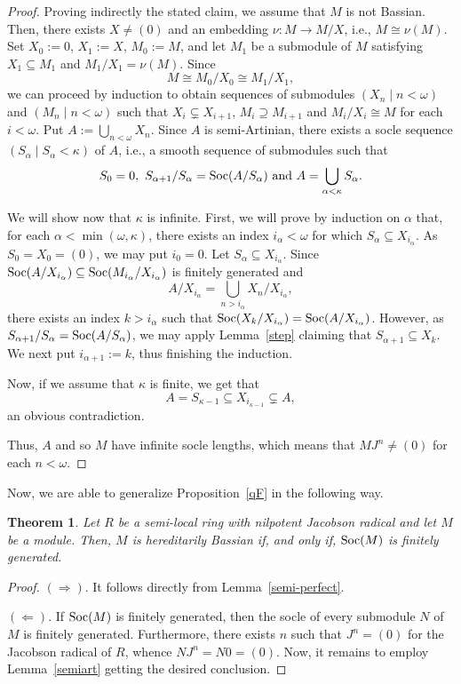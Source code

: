 \documentclass{amsart}
\newtheorem{thm}{Theorem}[section]
\theoremstyle{definition}
\DeclareMathOperator{\Soc}{\rm Soc}
\begin{document}
\begin{proof} Proving indirectly the stated claim, we assume that $M$ is not Bassian. Then, there exists $X\ne (0)$ and an embedding $\nu: M\to M/X$, i.e., $M\cong\nu(M)$. Set $X_0:=0$, $X_1:=X$, $M_0:=M$, and let $M_1$ be a submodule of $M$ satisfying $X_1\subseteq M_1$ and $M_1/X_1=\nu(M)$. Since $$M\cong M_0/X_0\cong M_1/X_1,$$ we can proceed by induction to obtain sequences of submodules $(X_n\mid n<\omega)$ and $(M_n\mid n<\omega)$ such that $X_{i}\subsetneq X_{i+1}$, $M_i \supseteq M_{i+1}$ and $M_i/X_i\cong M$ for each $i<\omega$. Put $A:=\bigcup_{n<\omega} X_n$. Since $A$ is semi-Artinian, there exists a socle sequence $(S_\alpha\mid S_\alpha<\kappa)$ of $A$, i.e., a smooth sequence of submodules such that $$S_0=0, ~ S_{\alpha+1}/S_\alpha=\Soc(A/S_\alpha) ~ {\rm and} ~ A=\bigcup_{\alpha<\kappa} S_\alpha.$$

We will show now that $\kappa$ is infinite. First, we will prove by induction on $\alpha$ that, for each $\alpha<\min(\omega,\kappa)$, there exists an index $i_\alpha<\omega$ for which $S_\alpha\subseteq X_{i_\alpha}$. As $S_0=X_0=(0)$, we may put $i_0=0$. Let $S_\alpha\subseteq X_{i_\alpha}$. Since $\Soc(A/X_{i_\alpha})\subseteq \Soc(M_{i_\alpha}/X_{i_\alpha})$ is finitely generated and $$A/X_{i_\alpha}=\bigcup_{n>i_\alpha} X_n/X_{i_\alpha},$$ there exists an index $k>i_\alpha$ such that $\Soc(X_k/X_{i_\alpha})=\Soc(A/X_{i_\alpha})$. However, as $S_{\alpha+1}/S_\alpha=\Soc(A/S_\alpha)$, we may apply Lemma~\ref{step} claiming that $S_{\alpha+1}\subseteq X_k$. We next put $i_{\alpha+1}:=k$, thus finishing the induction.

Now, if we assume that $\kappa$ is finite, we get that
$$
A=S_{\kappa-1}\subseteq X_{i_{\kappa-1}}\subsetneq A,
$$
an obvious contradiction.

Thus, $A$ and so $M$ have infinite socle lengths, which means that $MJ^n\ne (0)$ for each $n<\omega$.
\end{proof}

Now, we are able to generalize Proposition~\ref{qF} in the following way.

\begin{thm}\label{artinian} Let $R$ be a semi-local ring with nilpotent Jacobson radical and let $M$ be a module. Then, $M$ is hereditarily Bassian if, and only if, $\Soc(M)$ is finitely generated.
\end{thm}

\begin{proof} $(\Rightarrow)$. It follows directly from Lemma~\ref{semi-perfect}.
	
$(\Leftarrow)$. If $\Soc(M)$ is finitely generated, then the socle of every submodule $N$ of $M$ is finitely generated. Furthermore, there exists $n$ such that $J^n=(0)$ for the Jacobson radical of $R$, whence $NJ^n=N0=(0)$. Now, it remains to employ Lemma~\ref{semiart} getting the desired conclusion.
\end{proof}
\end{document}
